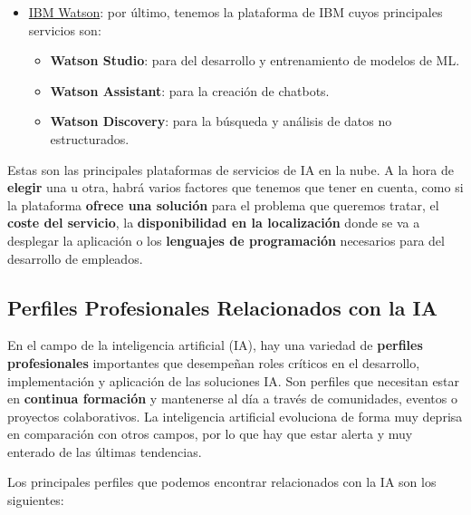 \begin{itemize}
	\item \href{https://www.ibm.com/watson}{IBM Watson}: por último, tenemos la plataforma de IBM cuyos principales servicios son:
	\begin{itemize}
		\item \textbf{Watson Studio}: para del desarrollo y entrenamiento de modelos de ML.
		\item \textbf{Watson Assistant}: para la creación de chatbots.
		\item \textbf{Watson Discovery}: para la búsqueda y análisis de datos no estructurados.
	\end{itemize}
\end{itemize}


Estas son las principales plataformas de servicios de IA en la nube. A la hora de \textbf{elegir} una u otra, habrá varios factores que tenemos que tener en cuenta, como si la plataforma \textbf{ofrece una solución} para el problema que queremos tratar, el \textbf{coste del servicio}, la \textbf{disponibilidad en la localización} donde se va a desplegar la aplicación o los \textbf{lenguajes de programación} necesarios para del desarrollo de empleados.

\subsection{Perfiles Profesionales Relacionados con la IA}
En el campo de la inteligencia artificial (IA), hay una variedad de \textbf{perfiles profesionales} importantes que desempeñan roles críticos en el desarrollo, implementación y aplicación de las soluciones IA. Son perfiles que necesitan estar en \textbf{continua formación} y mantenerse al día a través de comunidades, eventos o proyectos colaborativos. La inteligencia artificial evoluciona de forma muy deprisa en comparación con otros campos, por lo que hay que estar alerta y muy enterado de las últimas tendencias.

Los principales perfiles que podemos encontrar relacionados con la IA son los siguientes:

